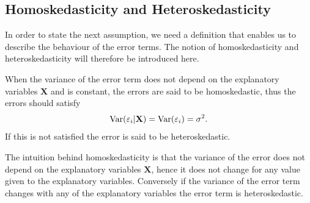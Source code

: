 \subsection{Homoskedasticity and Heteroskedasticity}

In order to state the next assumption, we need a definition that enables us to describe the behaviour of the error terms.
The notion of homoskedasticity and heteroskedasticity will therefore be introduced here.


\begin{definition}
When the variance of the error term does not depend on the explanatory variables $\mathbf{X}$ and is constant, the errors are said to be homoskedastic, thus the errors should satisfy
\begin{align*}
    \operatorname{\text{Var}}(\varepsilon_i | \mathbf{X}) = \operatorname{\text{Var}}(\varepsilon_i) = \sigma^2.
\end{align*}
If this is not satisfied the error is said to be heteroskedastic. 
\end{definition}
The intuition behind homoskedasticity is that the variance of the error does not depend on the explanatory variables $\mathbf{X}$, hence it does not change for any value given to the explanatory variables. Conversely if the variance of the error term changes with any of the explanatory variables the error term is heteroskedastic. 

